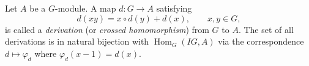 Let $A$ be a $G$-module. A map $d: G \to A$ satisfying
$$d(xy) = x \circ d(y) + d(x), \qquad x, y \in G,$$
is called a \emph{derivation} (or \emph{crossed homomorphism}) from $G$ to $A$. The set of all derivations is in natural bijection with $\operatorname{Hom}_G(IG, A)$ via the correspondence $d \mapsto \varphi_d$ where $\varphi_d(x - 1) = d(x)$.
